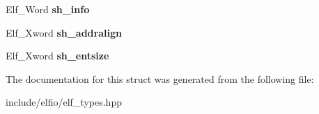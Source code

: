 \begin{DoxyCompactItemize}
\item 
Elf\+\_\+\+Word {\bfseries sh\+\_\+info}\hypertarget{struct_e_l_f_i_o_1_1_elf64___shdr_a047bae56503b67821e57cd112b4c58fb}{}\label{struct_e_l_f_i_o_1_1_elf64___shdr_a047bae56503b67821e57cd112b4c58fb}

\item 
Elf\+\_\+\+Xword {\bfseries sh\+\_\+addralign}\hypertarget{struct_e_l_f_i_o_1_1_elf64___shdr_a16b2126bc1e6cae9d7bf928820e82006}{}\label{struct_e_l_f_i_o_1_1_elf64___shdr_a16b2126bc1e6cae9d7bf928820e82006}

\item 
Elf\+\_\+\+Xword {\bfseries sh\+\_\+entsize}\hypertarget{struct_e_l_f_i_o_1_1_elf64___shdr_a25219e772cf088eb8e6c2e8ac0147dad}{}\label{struct_e_l_f_i_o_1_1_elf64___shdr_a25219e772cf088eb8e6c2e8ac0147dad}

\end{DoxyCompactItemize}


The documentation for this struct was generated from the following file\+:\begin{DoxyCompactItemize}
\item 
include/elfio/elf\+\_\+types.\+hpp\end{DoxyCompactItemize}
